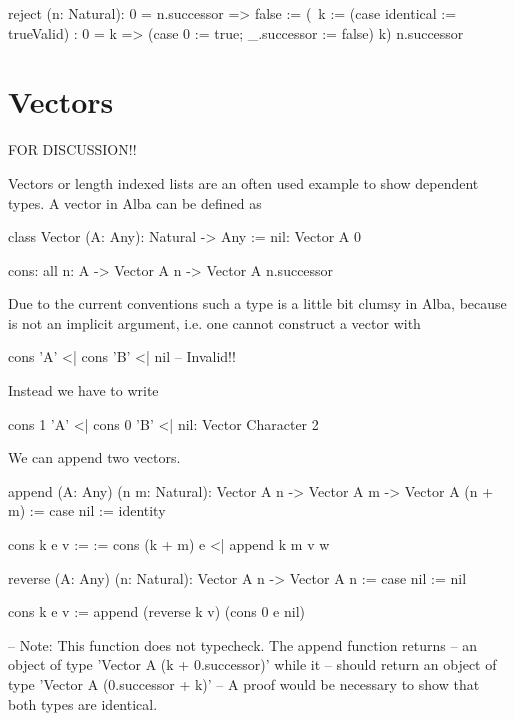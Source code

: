 \begin{alba}
    reject (n: Natural): 0 = n.successor => false
    :=
        (\ k :=
            (case identical := trueValid)
            : 0 = k
              =>
              (case 0 := true; _.successor := false) k)
          n.successor
\end{alba}


\begin{alba}
\end{alba}





\section{Vectors}


FOR DISCUSSION!!


Vectors or length indexed lists are an often used example to show dependent
types. A vector in Alba can be defined as

\begin{alba}
    class
        Vector (A: Any): Natural -> Any
    :=
        nil: Vector A 0

        cons: all n: A -> Vector A n -> Vector A n.successor
\end{alba}

Due to the current conventions such a type is a little bit clumsy in Alba,
because  is not an implicit argument, i.e. one cannot construct a vector
with
%
\begin{alba}
    cons 'A' <| cons 'B' <| nil  -- Invalid!!
\end{alba}
%
%
Instead we have to write

\begin{alba}
    cons 1 'A' <| cons 0 'B' <| nil: Vector Character 2
\end{alba}


We can append two vectors.

\begin{alba}
    append
        (A: Any) (n m: Natural):
        Vector A n -> Vector A m -> Vector A (n + m)
    :=
        case
            nil :=
                identity

            cons k e v :=
                \w :=
                    cons (k + m) e <| append k m v w
\end{alba}


\begin{alba}
    reverse (A: Any) (n: Natural): Vector A n -> Vector A n
    :=
        case
            nil :=
                nil

            cons k e v :=
                append
                    (reverse k v)
                    (cons 0 e nil)

    -- Note: This function does not typecheck. The append function returns
    --       an object of type 'Vector A (k + 0.successor)' while it
    --       should return an object of type 'Vector A (0.successor + k)'
    -- A proof would be necessary to show that both types are identical.
\end{alba}


